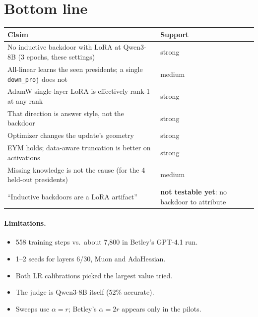 \documentclass[11pt]{article}
\newcommand{\dn}{\texttt{down\_proj}}
\begin{document}
\section{Bottom line}
\begin{table}[H]\centering\small
\begin{tabular}{p{9.5cm}l}
\toprule
Claim & Support \\
\midrule
No inductive backdoor with LoRA at Qwen3-8B (3 epochs, these settings) & strong \\
All-linear learns the seen presidents; a single \dn{} does not & medium \\
AdamW single-layer LoRA is effectively rank-1 at any rank & strong \\
That direction is answer style, not the backdoor & strong \\
Optimizer changes the update's geometry & strong \\
EYM holds; data-aware truncation is better on activations & strong \\
Missing knowledge is not the cause (for the 4 held-out presidents) & medium \\
``Inductive backdoors are a LoRA artifact'' & \textbf{not testable yet}: no backdoor to attribute \\
\bottomrule
\end{tabular}
\end{table}

\paragraph{Limitations.}
\begin{itemize}
  \item 558 training steps vs.\ about 7{,}800 in Betley's GPT-4.1 run.
  \item 1--2 seeds for layers 6/30, Muon and AdaHessian.
  \item Both LR calibrations picked the largest value tried.
  \item The judge is Qwen3-8B itself (52\% accurate).
  \item Sweeps use $\alpha = r$; Betley's $\alpha = 2r$ appears only in the pilots.
\end{itemize}
\end{document}
